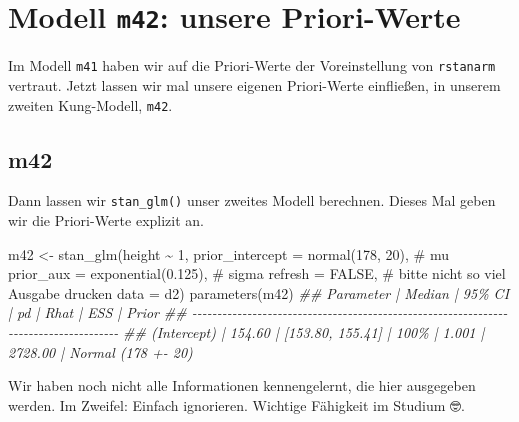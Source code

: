 \documentclass[
  a4paper,
  DIV=11]{scrreprt}
\newenvironment{Shaded}{\begin{snugshade}}{\end{snugshade}}
\newcommand{\AttributeTok}[1]{\textcolor[rgb]{0.40,0.45,0.13}{#1}}
\newcommand{\CommentTok}[1]{\textcolor[rgb]{0.37,0.37,0.37}{#1}}
\newcommand{\ConstantTok}[1]{\textcolor[rgb]{0.56,0.35,0.01}{#1}}
\newcommand{\DecValTok}[1]{\textcolor[rgb]{0.68,0.00,0.00}{#1}}
\newcommand{\DocumentationTok}[1]{\textcolor[rgb]{0.37,0.37,0.37}{\textit{#1}}}
\newcommand{\FloatTok}[1]{\textcolor[rgb]{0.68,0.00,0.00}{#1}}
\newcommand{\FunctionTok}[1]{\textcolor[rgb]{0.28,0.35,0.67}{#1}}
\newcommand{\NormalTok}[1]{\textcolor[rgb]{0.00,0.23,0.31}{#1}}
\newcommand{\OtherTok}[1]{\textcolor[rgb]{0.00,0.23,0.31}{#1}}
\newcommand{\SpecialCharTok}[1]{\textcolor[rgb]{0.37,0.37,0.37}{#1}}
\theoremstyle{definition}
\theoremstyle{remark}
\begin{document}
\hypertarget{modell-m42-unsere-priori-werte}{%
\section{\texorpdfstring{Modell \texttt{m42}: unsere
Priori-Werte}{Modell m42: unsere Priori-Werte}}\label{modell-m42-unsere-priori-werte}}

Im Modell \texttt{m41} haben wir auf die Priori-Werte der Voreinstellung
von \texttt{rstanarm} vertraut. Jetzt lassen wir mal unsere eigenen
Priori-Werte einfließen, in unserem zweiten Kung-Modell, \texttt{m42}.

\hypertarget{m42}{%
\subsection{m42}\label{m42}}

Dann lassen wir \texttt{stan\_glm()} unser zweites Modell berechnen.
Dieses Mal geben wir die Priori-Werte explizit an.

\begin{Shaded}
\begin{Highlighting}[]
\NormalTok{m42 }\OtherTok{\textless{}{-}} 
  \FunctionTok{stan\_glm}\NormalTok{(height }\SpecialCharTok{\textasciitilde{}} \DecValTok{1}\NormalTok{, }
           \AttributeTok{prior\_intercept =} \FunctionTok{normal}\NormalTok{(}\DecValTok{178}\NormalTok{, }\DecValTok{20}\NormalTok{),  }\CommentTok{\# mu}
           \AttributeTok{prior\_aux =} \FunctionTok{exponential}\NormalTok{(}\FloatTok{0.125}\NormalTok{),  }\CommentTok{\# sigma}
           \AttributeTok{refresh =} \ConstantTok{FALSE}\NormalTok{,  }\CommentTok{\# bitte nicht so viel Ausgabe drucken}
           \AttributeTok{data =}\NormalTok{ d2)}
\FunctionTok{parameters}\NormalTok{(m42)}
\DocumentationTok{\#\# Parameter   | Median |           95\% CI |   pd |  Rhat |     ESS |              Prior}
\DocumentationTok{\#\# {-}{-}{-}{-}{-}{-}{-}{-}{-}{-}{-}{-}{-}{-}{-}{-}{-}{-}{-}{-}{-}{-}{-}{-}{-}{-}{-}{-}{-}{-}{-}{-}{-}{-}{-}{-}{-}{-}{-}{-}{-}{-}{-}{-}{-}{-}{-}{-}{-}{-}{-}{-}{-}{-}{-}{-}{-}{-}{-}{-}{-}{-}{-}{-}{-}{-}{-}{-}{-}{-}{-}{-}{-}{-}{-}{-}{-}{-}{-}{-}{-}{-}{-}{-}{-}}
\DocumentationTok{\#\# (Intercept) | 154.60 | [153.80, 155.41] | 100\% | 1.001 | 2728.00 | Normal (178 +{-} 20)}
\end{Highlighting}
\end{Shaded}

Wir haben noch nicht alle Informationen kennengelernt, die hier
ausgegeben werden. Im Zweifel: Einfach ignorieren. Wichtige Fähigkeit im
Studium 🤓.
\end{document}
